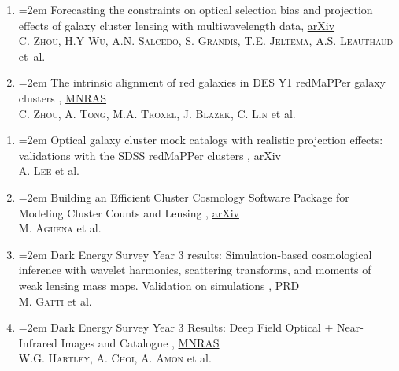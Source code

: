 \documentclass{scrartcl}
\newcommand{\paper}[1]{\noindent\hangindent=2em\hangafter=0 \footnotesize #1  %
\vspace{0.5em}} %
\begin{document}
\begin{cv}{}
\begin{enumerate}
    \item \paper{Forecasting the constraints on optical selection bias and projection effects of galaxy cluster lensing with multiwavelength data, \href{https://academic.oup.com/mnras/advance-article/doi/10.1093/mnras/stad2712/7264871}{arXiv} }\\
    \textsc{C. Zhou, H.Y Wu, A.N. Salcedo, S. Grandis, T.E. Jeltema, A.S. Leauthaud} et~al.

    \item \paper{The intrinsic alignment of red galaxies in DES Y1 redMaPPer galaxy clusters}, \href{https://academic.oup.com/mnras/advance-article/doi/10.1093/mnras/stad2712/7264871}{MNRAS} \\
    \textsc{C. Zhou, A. Tong, M.A. Troxel, J. Blazek, C. Lin} et al.

    \end{enumerate}

    \vspace{0.2em}
    \begin{enumerate}
        \item \paper{Optical galaxy cluster mock catalogs with realistic projection effects: validations with the SDSS redMaPPer clusters}, \href{https://arxiv.org/abs/2410.02497}{arXiv}\\
        \textsc{A. Lee} et al. 
        \item \paper{Building an Efficient Cluster Cosmology Software Package for Modeling Cluster Counts and Lensing}, \href{https://arxiv.org/abs/2309.06593}{arXiv}\\
        \textsc{M. Aguena} et al. 
        \item \paper{Dark Energy Survey Year 3 results: Simulation-based cosmological inference with wavelet harmonics, scattering transforms, and moments of weak lensing mass maps. Validation on simulations}, \href{https://journals.aps.org/prd/abstract/10.1103/PhysRevD.109.063534}{PRD}\\
        \textsc{M. Gatti} et al. 
        \item \paper{Dark Energy Survey Year 3 Results: Deep Field Optical + Near-Infrared Images and Catalogue}, \href{https://academic.oup.com/mnras/article/509/3/3547/6412546}{MNRAS}\\
        \textsc{W.G. Hartley, A. Choi, A. Amon} et al. 
    \end{enumerate}

    \vspace{1em} %


\end{cv}
\end{document}
